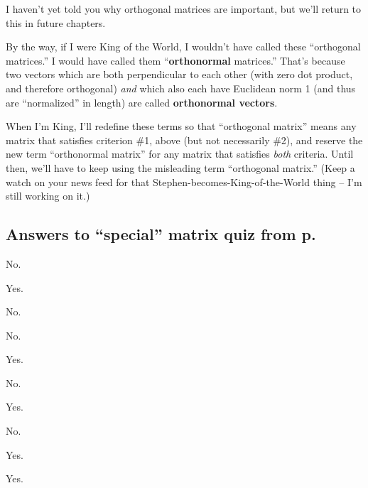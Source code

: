 
I haven't yet told you why orthogonal matrices are important, but we'll return
to this in future chapters.


By the way, if I were King of the World, I wouldn't have called these
``orthogonal matrices.'' I would have called them ``\textbf{orthonormal}
matrices.'' That's because two vectors which are both perpendicular to each
other (with zero dot product, and therefore orthogonal) \textit{and} which also
each have Euclidean norm 1 (and thus are ``normalized'' in length) are called
\textbf{orthonormal vectors}.

When I'm King, I'll redefine these terms so that ``orthogonal matrix'' means
any matrix that satisfies criterion \#1, above (but not necessarily \#2), and
reserve the new term ``orthonormal matrix'' for any matrix that satisfies
\textit{both} criteria. Until then, we'll have to keep using the misleading
term ``orthogonal matrix.'' (Keep a watch on your news feed for that
Stephen-becomes-King-of-the-World thing -- I'm still working on it.)

\vfill

\pagebreak



\subsection*{Answers to ``special'' matrix quiz from
p.~\pageref{specialMatrixQuiz}}

\label{specialMatrixQuizSols}

\begin{multicols}{3}
\begin{compactenum}
\item No.
\item Yes.
\item No.
\item No.
\item Yes.
\item No.
\item Yes.
\item No.
\item Yes.
\item Yes.
\end{compactenum}
\end{multicols}


